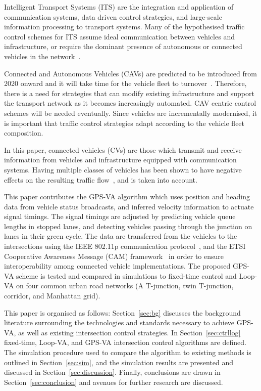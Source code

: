\documentclass[numbered]{trbunofficial}
\begin{document}
Intelligent Transport Systems (ITS) are the integration and application of communication systems, data driven control strategies, and large-scale information processing to transport systems. Many of the hypothesised traffic control schemes for ITS assume ideal communication between vehicles and infrastructure, or require the dominant presence of autonomous or connected vehicles in the network~\cite{goodall2013, Au2015, HomChaudhuri2016}. 

Connected and Autonomous Vehicles (CAVs) are predicted to be introduced from 2020 onward and it will take time for the vehicle fleet to turnover~\cite{litman2016}. Therefore, there is a need for strategies that can modify existing infrastructure and support the transport network as it becomes increasingly automated. CAV centric control schemes will be needed eventually. Since vehicles are incrementally modernised, it is important that traffic control strategies adapt according to the vehicle fleet composition.

In this paper, connected vehicles (CVs) are those which transmit and receive information from vehicles and infrastructure equipped with communication systems. Having multiple classes of vehicles has been shown to have negative effects on the resulting traffic flow~\cite{Ngoduy2012, Ngoduy2014}, and is taken into account.

This paper contributes the GPS-VA algorithm which uses position and heading data from vehicle status broadcasts, and inferred velocity information to actuate signal timings. The signal timings are adjusted by predicting vehicle queue lengths in stopped lanes, and detecting vehicles passing through the junction on lanes in their green cycle. The data are transferred from the vehicles to the intersections using the IEEE 802.11p communication protocol~\cite{ieee80211p}, and the ETSI Cooperative Awareness Message (CAM) framework~\cite{EtsiCAM2011} in order to ensure interoperability among connected vehicle implementations. The proposed GPS-VA scheme is tested and compared in simulations to fixed-time control and Loop-VA on four common urban road networks (A T-junction, twin T-junction, corridor, and Manhattan grid). %

This paper is organised as follows: Section~\ref{sec:bg} discusses the background literature surrounding the technologies and standards necessary to achieve GPS-VA, as well as existing intersection control strategies. In Section~\ref{sec:ctrllog} fixed-time, Loop-VA, and GPS-VA intersection control algorithms are defined. The simulation procedure used to compare the algorithm to existing methods is outlined in Section~\ref{sec:sim}, and the simulation results are presented and discussed in Section~\ref{sec:discussion}. Finally, conclusions are drawn in Section~\ref{sec:conclusion} and avenues for further research are discussed.
\end{document}
